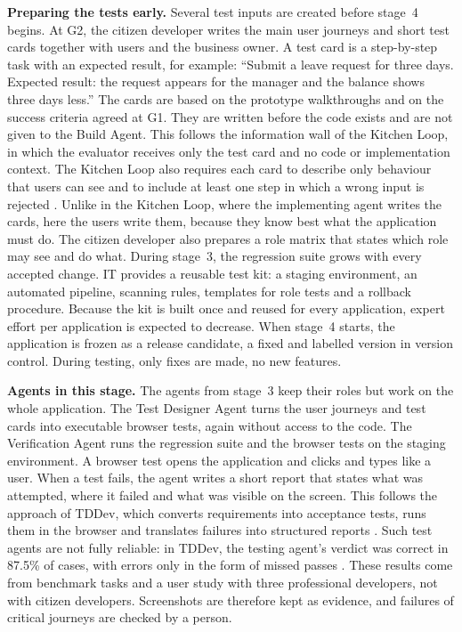 \documentclass[10pt,a4paper]{article}
\begin{document}
\textbf{Preparing the tests early.} Several test inputs are created before
stage~4 begins. At G2, the citizen developer writes the main user journeys and
short test cards together with users and the business owner. A test card is a
step-by-step task with an expected result, for example: \enquote{Submit a
leave request for three days. Expected result: the request appears for the
manager and the balance shows three days less.} The cards are based on the
prototype walkthroughs and on the success criteria agreed at G1. They are
written before the code exists and are not given to the Build Agent. This
follows the information wall of the Kitchen Loop, in which the evaluator
receives only the test card and no code or implementation context. The
Kitchen Loop also requires each card to describe only behaviour that users can
see and to include at least one step in which a wrong input is rejected
\parencite{TODO-kitchenloop}. Unlike in the Kitchen Loop, where the
implementing agent writes the cards, here the users write them, because they
know best what the application must do. The citizen developer also prepares a
role matrix that states which role may see and do what. During stage~3, the
regression suite grows with every accepted change. IT provides a reusable test
kit: a staging environment, an automated pipeline, scanning rules, templates
for role tests and a rollback procedure. Because the kit is built once and
reused for every application, expert effort per application is expected to
decrease. When stage~4 starts, the application is frozen as a release
candidate, a fixed and labelled version in version control. During testing,
only fixes are made, no new features.

\textbf{Agents in this stage.} The agents from stage~3 keep their roles but
work on the whole application. The Test Designer Agent turns the user journeys
and test cards into executable browser tests, again without access to the
code. The Verification Agent runs the regression suite and the browser tests
on the staging environment. A browser test opens the application and clicks
and types like a user. When a test fails, the agent writes a short report that
states what was attempted, where it failed and what was visible on the
screen. This follows the approach of TDDev, which converts requirements into
acceptance tests, runs them in the browser and translates failures into
structured reports \parencite{TODO-tddev}. Such test agents are not fully
reliable: in TDDev, the testing agent's verdict was correct in 87.5\% of
cases, with errors only in the form of missed passes \parencite{TODO-tddev}.
These results come from benchmark tasks and a user study with three
professional developers, not with citizen developers. Screenshots are
therefore kept as evidence, and failures of critical journeys are checked by a
person.
\end{document}
